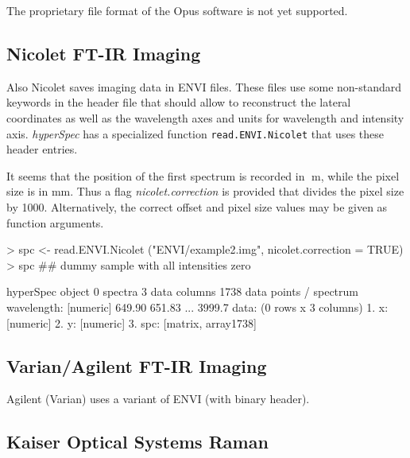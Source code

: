 \documentclass[english, a4paper, 10pt, headings=small, DIV11]{scrartcl}
\renewenvironment{Schunk}{\vspace{0pt}\begin{small}}{\end{small}\vspace{0pt}}
\newcommand{\Rfunction}[2][]{\texorpdfstring{\nohyphens{#1\texttt{#2}}}{#2}}
\newcommand{\Rfunarg}[1]{\texorpdfstring{\nohyphens{\textit{#1}}}{#1}}
\newcommand{\phy}{\texorpdfstring{\nohyphens{\textit{hyperSpec}}}{hyperSpec}\xspace}
\newcommand{\mum}[1]{\ensuremath{#1\;}\textmu m\xspace}
\begin{document}
The proprietary file format of the Opus software is not yet supported.

\subsection{Nicolet FT-IR Imaging}
\label{sec:read.ENVI.Nicolet}

Also Nicolet saves imaging data in ENVI files. These files use some non-standard keywords in the
header file that should allow to reconstruct the lateral coordinates as well as the wavelength axes
and units for wavelength and intensity axis. \phy has a specialized function
\Rfunction{read.ENVI.Nicolet} that uses these header entries.

It seems that the position of the first spectrum is recorded in \mum{}, while the pixel size is in
mm. Thus a flag \Rfunarg{nicolet.correction} is provided that divides the pixel size by 1000.
Alternatively, the correct offset and pixel size values may be given as function arguments.

\begin{Schunk}
\begin{Sinput}
> spc <- read.ENVI.Nicolet ("ENVI/example2.img", nicolet.correction = TRUE)
> spc ## dummy sample with all intensities zero
\end{Sinput}
\begin{Soutput}
hyperSpec object
   0 spectra
   3 data columns
   1738 data points / spectrum
wavelength:  [numeric] 649.90 651.83 ... 3999.7 
data:  (0 rows x 3 columns)
   1. x:  [numeric]
   2. y:  [numeric]
   3. spc:  [matrix, array1738]
\end{Soutput}
\end{Schunk}

\subsection{Varian/Agilent FT-IR Imaging}
\label{sec:varianagilent-ft-ir}

Agilent (Varian) uses a variant of ENVI (with binary header).

\subsection{Kaiser Optical Systems Raman}
\label{sec:Kaiser}
\end{document}
